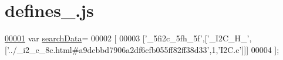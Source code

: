 \hypertarget{defines__0_8js_source}{}\section{defines\+\_.\+js}
\label{defines__0_8js_source}

\begin{DoxyCode}
\hypertarget{defines__0_8js_source.tex_l00001}{}\hyperlink{defines__0_8js_ad01a7523f103d6242ef9b0451861231e}{00001} var \hyperlink{defines__0_8js_ad01a7523f103d6242ef9b0451861231e}{searchData}=
00002 [
00003   [\textcolor{stringliteral}{'\_5fi2c\_5fh\_5f'},[\textcolor{stringliteral}{'\_I2C\_H\_'},[\textcolor{stringliteral}{'../\_i2\_c\_8c.html#a9dcbbd7906a2df6cfb055ff82ff38d33'},1,\textcolor{stringliteral}{'I2C.c'}]]]
00004 ];
\end{DoxyCode}
